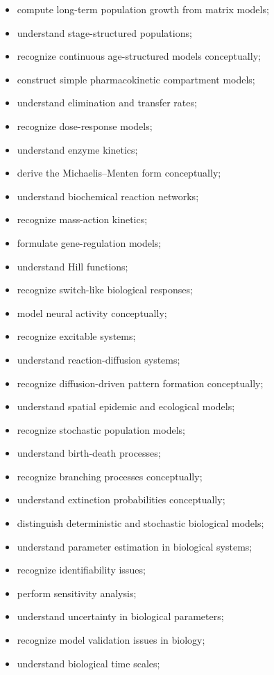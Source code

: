 {\begin{itemize}
    \item compute long-term population growth from matrix models;
    \item understand stage-structured populations;
    \item recognize continuous age-structured models conceptually;
    \item construct simple pharmacokinetic compartment models;
    \item understand elimination and transfer rates;
    \item recognize dose-response models;
    \item understand enzyme kinetics;
    \item derive the Michaelis--Menten form conceptually;
    \item understand biochemical reaction networks;
    \item recognize mass-action kinetics;
    \item formulate gene-regulation models;
    \item understand Hill functions;
    \item recognize switch-like biological responses;
    \item model neural activity conceptually;
    \item recognize excitable systems;
    \item understand reaction-diffusion systems;
    \item recognize diffusion-driven pattern formation conceptually;
    \item understand spatial epidemic and ecological models;
    \item recognize stochastic population models;
    \item understand birth-death processes;
    \item recognize branching processes conceptually;
    \item understand extinction probabilities conceptually;
    \item distinguish deterministic and stochastic biological models;
    \item understand parameter estimation in biological systems;
    \item recognize identifiability issues;
    \item perform sensitivity analysis;
    \item understand uncertainty in biological parameters;
    \item recognize model validation issues in biology;
    \item understand biological time scales;

\end{itemize}}
